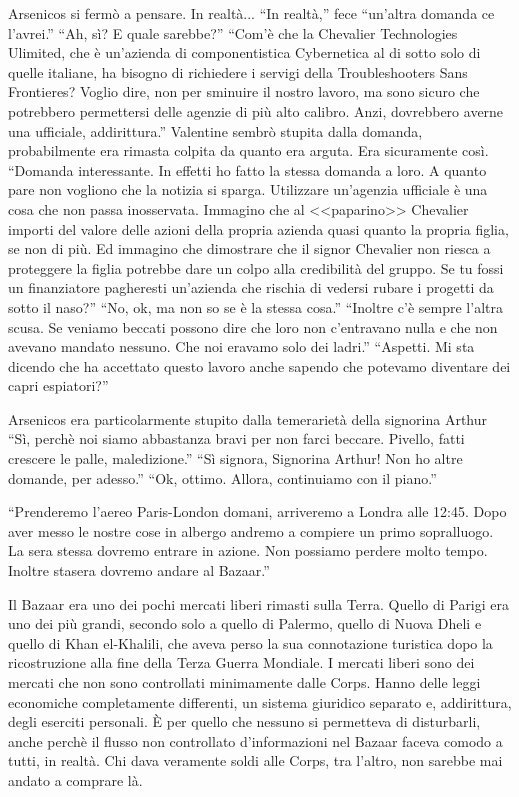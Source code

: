     Arsenicos si fermò a pensare. In realtà... ``In realtà,'' fece ``un'altra domanda ce l'avrei.'' ``Ah, sì? E quale
    sarebbe?'' ``Com'è che la Chevalier Technologies Ulimited, che è un'azienda di componentistica Cybernetica al di
    sotto solo di quelle italiane, ha bisogno di richiedere i servigi della Troubleshooters Sans Frontieres? Voglio
    dire, non per sminuire il nostro lavoro, ma sono sicuro che potrebbero permettersi delle agenzie di più alto
    calibro. Anzi, dovrebbero averne una ufficiale, addirittura.'' Valentine sembrò stupita dalla domanda, probabilmente
    era rimasta colpita da quanto era arguta. Era sicuramente così. ``Domanda interessante. In effetti ho fatto la
    stessa domanda a loro. A quanto pare non vogliono che la notizia si sparga. Utilizzare un'agenzia ufficiale è una
    cosa che non passa inosservata. Immagino che al <<paparino>> Chevalier importi del valore delle azioni della propria
    azienda quasi quanto la propria figlia, se non di più. Ed immagino che dimostrare che il signor Chevalier non riesca
    a proteggere la figlia potrebbe dare un colpo alla credibilità del gruppo. Se tu fossi un finanziatore pagheresti
    un'azienda che rischia di vedersi rubare i progetti da sotto il naso?'' ``No, ok, ma non so se è la stessa cosa.''
    ``Inoltre c'è sempre l'altra scusa. Se veniamo beccati possono dire che loro non c'entravano nulla e che non avevano
    mandato nessuno. Che noi eravamo solo dei ladri.'' ``Aspetti. Mi sta dicendo che ha accettato questo lavoro anche
    sapendo che potevamo diventare dei capri espiatori?''

    Arsenicos era particolarmente stupito dalla temerarietà della signorina Arthur ``Sì, perchè noi siamo abbastanza
    bravi per non farci beccare. Pivello, fatti crescere le palle, maledizione.'' ``Sì signora, Signorina Arthur! Non ho
    altre domande, per adesso.'' ``Ok, ottimo. Allora, continuiamo con il piano.''

    ``Prenderemo l'aereo Paris-London domani, arriveremo a Londra alle 12:45. Dopo aver messo le nostre cose in albergo
    andremo a compiere un primo sopralluogo. La sera stessa dovremo entrare in azione. Non possiamo perdere molto tempo.
    Inoltre stasera dovremo andare al Bazaar.''

    Il Bazaar era uno dei pochi mercati liberi rimasti sulla Terra. Quello di Parigi era uno dei più grandi, secondo
    solo a quello di Palermo, quello di Nuova Dheli e quello di Khan el-Khalili, che aveva perso la sua connotazione
    turistica dopo la ricostruzione alla fine della Terza Guerra Mondiale. I mercati liberi sono dei mercati che non
    sono controllati minimamente dalle Corps. Hanno delle leggi economiche completamente differenti, un sistema
    giuridico separato e, addirittura, degli eserciti personali. È per quello che nessuno si permetteva di disturbarli,
    anche perchè il flusso non controllato d'informazioni nel Bazaar faceva comodo a tutti, in realtà. Chi dava
    veramente soldi alle Corps, tra l'altro, non sarebbe mai andato a comprare là.


